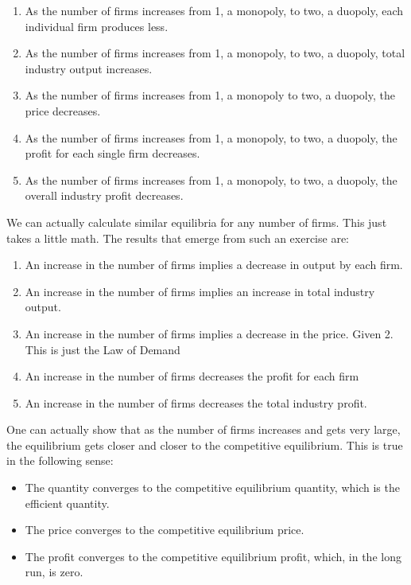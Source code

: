\documentclass[
]{book}
\providecommand{\tightlist}{%
  \setlength{\itemsep}{0pt}\setlength{\parskip}{0pt}}
\begin{document}
\begin{enumerate}
\def\labelenumi{\arabic{enumi}.}
\tightlist
\item
  As the number of firms increases from 1, a monopoly, to two, a duopoly, each individual firm produces less.
\item
  As the number of firms increases from 1, a monopoly, to two, a duopoly, total industry output increases.\\
\item
  As the number of firms increases from 1, a monopoly to two, a duopoly, the price decreases.
\item
  As the number of firms increases from 1, a monopoly, to two, a duopoly, the profit for each single firm decreases.
\item
  As the number of firms increases from 1, a monopoly, to two, a duopoly, the overall industry profit decreases.
\end{enumerate}

We can actually calculate similar equilibria for any number of firms. This just takes a little math. The results that emerge from such an exercise are:

\begin{enumerate}
\def\labelenumi{\arabic{enumi}.}
\tightlist
\item
  An increase in the number of firms implies a decrease in output by each firm.
\item
  An increase in the number of firms implies an increase in total industry output.
\item
  An increase in the number of firms implies a decrease in the price. Given 2. This is just the Law of Demand
\item
  An increase in the number of firms decreases the profit for each firm
\item
  An increase in the number of firms decreases the total industry profit.
\end{enumerate}

One can actually show that as the number of firms increases and gets very large, the equilibrium gets closer and closer to the competitive equilibrium. This is true in the following sense:

\begin{itemize}
\tightlist
\item
  The quantity converges to the competitive equilibrium quantity, which is the efficient quantity.
\item
  The price converges to the competitive equilibrium price.
\item
  The profit converges to the competitive equilibrium profit, which, in the long run, is zero.
\end{itemize}
\end{document}
